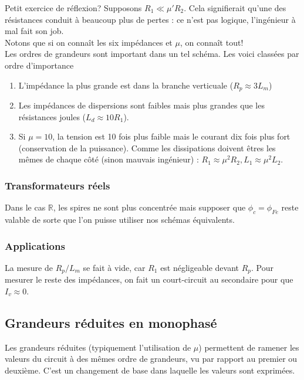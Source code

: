 		
		Petit exercice de réflexion? Supposons $R_1\ll \mu'R_2$. Cela signifierait 
		qu'une des résistances conduit à beaucoup plus de pertes : ce n'est pas 
		logique, l'ingénieur à mal fait son job.\\
		Notons que si on connaît les six impédances et $\mu$, on connaît tout!\\
		
		Les ordres de grandeurs sont important dans un tel schéma. Les voici 
		classées par ordre d'importance 
		\begin{enumerate}
		\item L'impédance la plus grande est dans la branche verticuale ($R_p \approx 
		3 L_m$)
		\item Les impédances de dispersions sont faibles mais plus grandes que 
		les résistances joules ($L_d \approx 10 R_1$).
		\item Si $\mu = 10$, la tension est 10 fois plus faible mais le courant 
		dix fois plus fort (conservation de la puissance). Comme les dissipations 
		doivent êtres les mêmes de chaque côté (sinon mauvais ingénieur) : $R_1 
		\approx \mu^2R_2, L_1\approx \mu^2L_2$.
		\end{enumerate}
		
	
		\subsubsection{Transformateurs réels}
		Dans le cas $\mathbb{R}$, les spires ne sont plus concentrée mais 
		supposer que $\phi_c = \phi_{Fe}$ reste valable de sorte que l'on 
		puisse utiliser nos schémas équivalents.	
	
		\subsubsection{Applications}
		La mesure de $R_p/L_m$ se fait à vide, car $R_1$ est négligeable devant 
		$R_p$. Pour mesurer le reste des impédances, on fait un court-circuit 
		au secondaire pour que $I_v\approx0$.
		
		
	\subsection{Grandeurs réduites en monophasé}
	Les grandeurs réduites (typiquement l'utilisation de $\mu$) permettent de ramener les valeurs du circuit à des mêmes ordre de grandeurs, vu par rapport au premier ou deuxième. C'est un changement de base dans laquelle les valeurs sont exprimées. 
	
